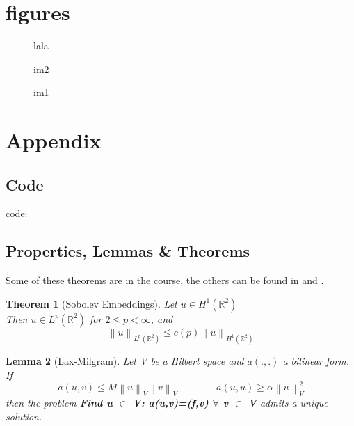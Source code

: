 \documentclass[conference]{IEEEtran}
\newcommand{\norm}[1]{\left\lVert#1\right\rVert}
\newtheorem{theorem}{Theorem}[section]
\newtheorem{lemma}[theorem]{Lemma}
\begin{document}
\section{figures}

\begin{figure}[!ht]
\centering 
\caption{lala}
\label{fig:fig7}
\end{figure}

\begin{figure}[!ht]
\centering 
\begin{minipage}[t]{4cm} 
\centering 
\caption{im2} 
\label{fig:fig8}
\end{minipage} 
\begin{minipage}[t]{4cm} 
\centering 
\caption{im1}
\label{fig:fig9}
\end{minipage} 
\end{figure}

\section{Appendix}\label{sec:appendix}
\subsection{Code}
code: 
\subsection{Properties, Lemmas \& Theorems}
Some of these theorems are in the course, the others can be found in \cite{Salsa} and \cite{Perotto}. \\
\begin{theorem}[Sobolev Embeddings\cite{Salsa}]
\label{th:sob}
Let $ u \in H^1(\mathbb{R}^2)$ \\
Then $u \in L^p(\mathbb{R}^2)$ for $2 \leq p < \infty$, and
$$\norm{u}_{L^p(\mathbb{R}^2)} \leq c(p) \norm{u}_{H^1(\mathbb{R}^2)} $$
\end{theorem}
\begin{lemma}[Lax-Milgram]
\label{th:laxMilgram}
Let V be a Hilbert space and $a(.,.)$ a bilinear form. If
$$ a(u,v) \leq M \norm{u}_V \norm{v}_V \qquad \qquad a(u,u)\geq \alpha \norm{u}_V^2$$
then the problem \textbf{Find u $\in$ V: a(u,v)=(f,v) $\forall$ v $\in$ V} admits a unique solution.
\end{lemma}
\end{document}
